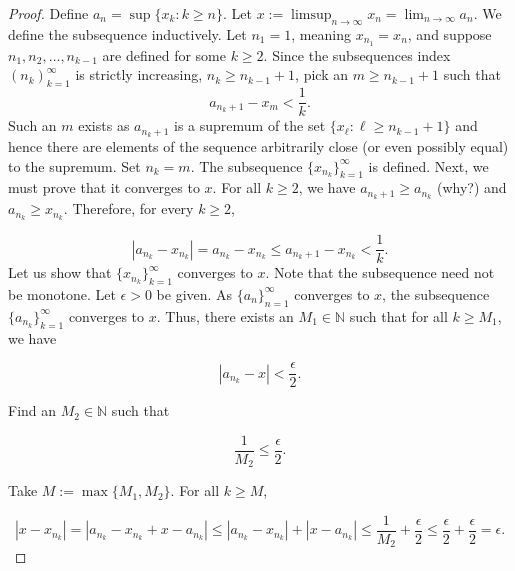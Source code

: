 \documentclass[../main.tex]{subfiles}
\begin{document}
    \begin{proof}
    Define $a_n = \sup\{x_k : k \geq n\}$. Let $x := \limsup_{n \to \infty} x_n = \lim_{n \to \infty} a_n$. We define the subsequence inductively. Let $n_1 = 1$, meaning \(x_{n_1} = x_n\), and suppose $n_1, n_2, \dots, n_{k-1}$ are defined for some $k \geq 2$. Since the subsequences index \( (n_k)_{k=1}^{\infty}\) is strictly increasing, \(n_k \geq n_{k-1}+1\), pick an $m \geq n_{k-1} + 1$ such that
    \[
    a_{n_k+1} - x_m < \frac{1}{k}.
    \]
    Such an $m$ exists as $a_{n_k+1}$ is a supremum of the set $\{x_\ell : \ell \geq n_{k-1} + 1\}$ and hence there are elements of the sequence arbitrarily close (or even possibly equal) to the supremum. Set
    $n_k = m$. The subsequence $\{x_{n_k}\}_{k=1}^{\infty}$ is defined. Next, we must prove that it converges to $x$.
    For all $k \geq 2$, we have $a_{n_k+1} \geq a_{n_k}$ (why?) and $a_{n_k} \geq x_{n_k}$. Therefore, for every $k \geq 2$,
    
    \[
    |a_{n_k} - x_{n_k}| = a_{n_k} - x_{n_k} \leq a_{n_k+1} - x_{n_k} < \frac{1}{k}.
    \]
    Let us show that $\{x_{n_k}\}_{k=1}^{\infty}$ converges to $x$. Note that the subsequence need not be
    monotone. Let $\epsilon > 0$ be given. As $\{a_n\}_{n=1}^{\infty}$ converges to $x$, the subsequence $\{a_{n_k}\}_{k=1}^{\infty}$
    converges to $x$. Thus, there exists an $M_1 \in \mathbb{N}$ such that for all $k \geq M_1$, we have
    
    \[
    |a_{n_k} - x| < \frac{\epsilon}{2}.
    \]
    
    Find an $M_2 \in \mathbb{N}$ such that
    
    \[
    \frac{1}{M_2} \leq \frac{\epsilon}{2}.
    \]
    
    Take $M := \max\{M_1, M_2\}$. For all $k \geq M$,
    
    \[
    |x - x_{n_k}| = |a_{n_k} - x_{n_k} + x - a_{n_k}| \leq |a_{n_k} - x_{n_k}| + |x - a_{n_k}|\leq \frac{1}{M_2} + \frac{\epsilon}{2} \leq \frac{\epsilon}{2} + \frac{\epsilon}{2} = \epsilon.
    \]
     
    \end{proof}
    
    
    
    
    
    
    
    
    
    
    
    
    
    
    
    
    
\end{document}
